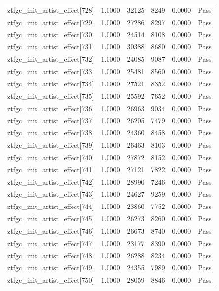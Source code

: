 \begin{table}[htbp]
\begin{tabular}{llrrll}
ztfgc\_init\_artist\_effect[728] & 1.0000 & 32125 & 8249 & 0.0000 & Pass \\
ztfgc\_init\_artist\_effect[729] & 1.0000 & 27286 & 8297 & 0.0000 & Pass \\
ztfgc\_init\_artist\_effect[730] & 1.0000 & 24514 & 8108 & 0.0000 & Pass \\
ztfgc\_init\_artist\_effect[731] & 1.0000 & 30388 & 8680 & 0.0000 & Pass \\
ztfgc\_init\_artist\_effect[732] & 1.0000 & 24085 & 9087 & 0.0000 & Pass \\
ztfgc\_init\_artist\_effect[733] & 1.0000 & 25481 & 8560 & 0.0000 & Pass \\
ztfgc\_init\_artist\_effect[734] & 1.0000 & 27521 & 8352 & 0.0000 & Pass \\
ztfgc\_init\_artist\_effect[735] & 1.0000 & 25592 & 7652 & 0.0000 & Pass \\
ztfgc\_init\_artist\_effect[736] & 1.0000 & 26963 & 9034 & 0.0000 & Pass \\
ztfgc\_init\_artist\_effect[737] & 1.0000 & 26205 & 7479 & 0.0000 & Pass \\
ztfgc\_init\_artist\_effect[738] & 1.0000 & 24360 & 8458 & 0.0000 & Pass \\
ztfgc\_init\_artist\_effect[739] & 1.0000 & 26463 & 8103 & 0.0000 & Pass \\
ztfgc\_init\_artist\_effect[740] & 1.0000 & 27872 & 8152 & 0.0000 & Pass \\
ztfgc\_init\_artist\_effect[741] & 1.0000 & 27121 & 7822 & 0.0000 & Pass \\
ztfgc\_init\_artist\_effect[742] & 1.0000 & 28990 & 7246 & 0.0000 & Pass \\
ztfgc\_init\_artist\_effect[743] & 1.0000 & 24627 & 9259 & 0.0000 & Pass \\
ztfgc\_init\_artist\_effect[744] & 1.0000 & 23860 & 7752 & 0.0000 & Pass \\
ztfgc\_init\_artist\_effect[745] & 1.0000 & 26273 & 8260 & 0.0000 & Pass \\
ztfgc\_init\_artist\_effect[746] & 1.0000 & 26673 & 8740 & 0.0000 & Pass \\
ztfgc\_init\_artist\_effect[747] & 1.0000 & 23177 & 8390 & 0.0000 & Pass \\
ztfgc\_init\_artist\_effect[748] & 1.0000 & 26288 & 8234 & 0.0000 & Pass \\
ztfgc\_init\_artist\_effect[749] & 1.0000 & 24355 & 7989 & 0.0000 & Pass \\
ztfgc\_init\_artist\_effect[750] & 1.0000 & 28059 & 8846 & 0.0000 & Pass \\

\end{tabular}
\end{table}
